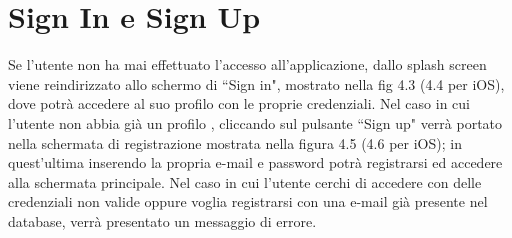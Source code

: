 \section*{Sign In e Sign Up}
Se l'utente non ha mai effettuato l'accesso all'applicazione, dallo splash screen viene reindirizzato allo schermo di ``Sign in", mostrato nella fig 4.3 (4.4 per iOS), dove potr\`a accedere al suo profilo con le proprie credenziali.
Nel caso in cui l'utente non abbia gi\`a un profilo , cliccando sul pulsante ``Sign up" verr\`a portato nella schermata di registrazione mostrata nella figura
4.5 (4.6 per iOS); in quest'ultima inserendo la propria e-mail e password potr\`a registrarsi ed accedere alla schermata principale.
Nel caso in cui l'utente cerchi di accedere con delle credenziali non valide oppure voglia registrarsi con una e-mail gi\`a
presente nel database, verr\`a presentato un messaggio di errore.
